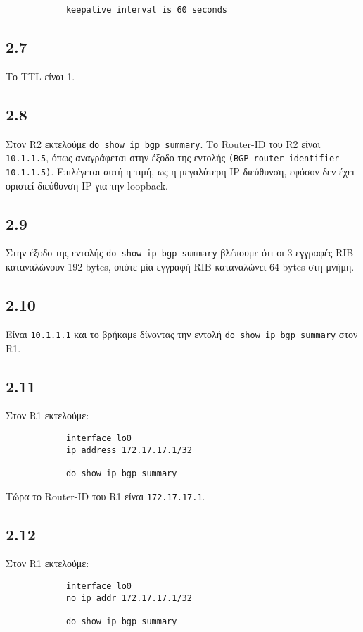 \documentclass[a4paper, 12pt]{article}
\begin{document}
		\begin{verbatim}
			keepalive interval is 60 seconds
		\end{verbatim}

	\subsection*{2.7}
		Το TTL είναι 1.

	\subsection*{2.8}
		Στον R2 εκτελούμε \verb|do show ip bgp summary|. Το Router-ID του R2 είναι \verb|10.1.1.5|, όπως αναγράφεται στην έξοδο της εντολής \verb|(BGP router identifier 10.1.1.5)|. Επιλέγεται αυτή η τιμή, ως η μεγαλύτερη IP διεύθυνση, εφόσον δεν έχει οριστεί διεύθυνση IP για την loopback.

	\subsection*{2.9}
		Στην έξοδο της εντολής \verb|do show ip bgp summary| βλέπουμε ότι οι 3 εγγραφές RIB καταναλώνουν 192 bytes, οπότε μία εγγραφή RIB καταναλώνει 64 bytes στη μνήμη.

	\subsection*{2.10}
		Είναι \verb|10.1.1.1| και το βρήκαμε δίνοντας την εντολή \verb|do show ip bgp summary| στον R1.

	\subsection*{2.11}
		Στον R1 εκτελούμε:
		
		\begin{verbatim}
			interface lo0
			ip address 172.17.17.1/32
			
			do show ip bgp summary
		\end{verbatim}
		
		Τώρα το Router-ID του R1 είναι \verb|172.17.17.1|.

	\subsection*{2.12}
		Στον R1 εκτελούμε: 
		
		\begin{verbatim}
			interface lo0
			no ip addr 172.17.17.1/32
			
			do show ip bgp summary
		\end{verbatim}
		
\end{document}
